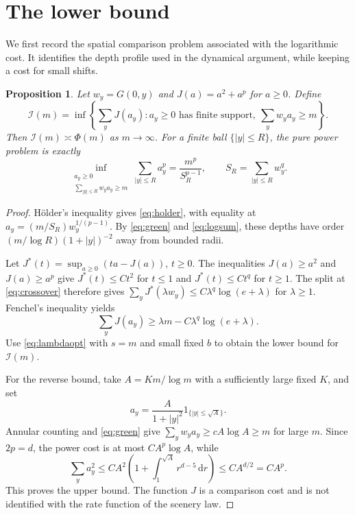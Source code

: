 \documentclass[11pt]{amsart}
\newtheorem{proposition}[theorem]{Proposition}
\theoremstyle{remark}
\newcommand{\ind}{\mathrm{1}}
\newcommand{\dd}{\,\mathrm d}
\begin{document}
\section{The lower bound}

We first record the spatial comparison problem associated with the
logarithmic cost. It identifies the depth profile used in the dynamical
argument, while keeping a cost for small shifts.

\begin{proposition}\label{prop:variational}
Let $w_y=G(0,y)$ and $J(a)=a^2+a^p$ for $a\ge0$. Define
\[
 \mathcal I(m)=\inf\left\{\sum_yJ(a_y): a_y\ge0\text{ has finite support},
                 \ \sum_yw_ya_y\ge m\right\}.
\]
Then $\mathcal I(m)\asymp\Phi(m)$ as $m\to\infty$.
For a finite ball $\{|y|\le R\}$, the pure power problem is exactly
\begin{equation}\label{eq:holder}
 \inf_{\substack{a_y\ge0\\\sum_{|y|\le R}w_ya_y\ge m}}
       \sum_{|y|\le R}a_y^p
 =\frac{m^p}{S_R^{p-1}},\qquad
 S_R=\sum_{|y|\le R}w_y^q.
\end{equation}
\end{proposition}

\begin{proof}
H\"older's inequality gives \eqref{eq:holder}, with equality at
$a_y=(m/S_R)w_y^{1/(p-1)}$.
By \eqref{eq:green} and \eqref{eq:logsum}, these depths have order
$(m/\log R)(1+|y|)^{-2}$ away from bounded radii.

Let $J^*(t)=\sup_{a\ge0}(ta-J(a))$, $t\ge0$.
The inequalities $J(a)\ge a^2$ and $J(a)\ge a^p$ give
$J^*(t)\le Ct^2$ for $t\le1$ and $J^*(t)\le Ct^q$ for $t\ge1$.
The split at \eqref{eq:crossover} therefore gives
$\sum_yJ^*(\lambda w_y)\le C\lambda^q\log(e+\lambda)$ for $\lambda\ge1$.
Fenchel's inequality yields
\[
 \sum_yJ(a_y)\ge\lambda m-C\lambda^q\log(e+\lambda).
\]
Use \eqref{eq:lambdaopt} with $s=m$ and small fixed $b$ to obtain the
lower bound for $\mathcal I(m)$.

For the reverse bound, take $A=K m/\log m$ with a sufficiently large
fixed $K$, and set
\[
 a_y=\frac{A}{1+|y|^2}\ind_{\{|y|\le\sqrt A\}}.
\]
Annular counting and \eqref{eq:green} give
$\sum_yw_ya_y\ge cA\log A\ge m$ for large $m$.
Since $2p=d$, the power cost is at most $CA^p\log A$, while
\[
 \sum_ya_y^2
 \le CA^2\left(1+\int_1^{\sqrt A}r^{d-5}\dd r\right)
 \le CA^{d/2}=CA^p.
\]
This proves the upper bound. The function $J$ is a comparison cost and
is not identified with the rate function of the scenery law.
\end{proof}
\end{document}
